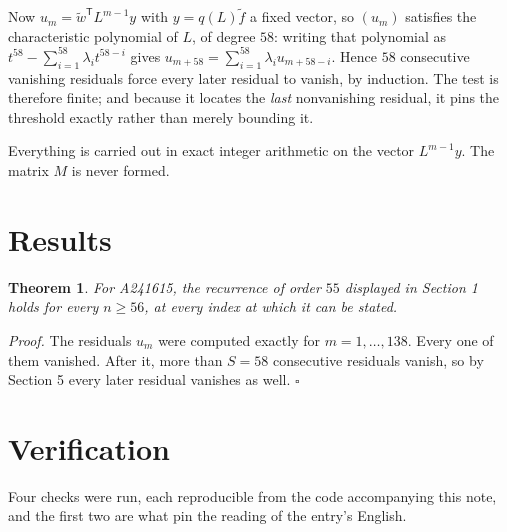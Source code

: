 \documentclass[11pt]{article}
\newtheorem{theorem}{Theorem}
\theoremstyle{definition}
\begin{document}
Now $u_m = \tilde w^{\mathsf T} L^{m-1} y$ with $y = q(L)\tilde f$ a fixed vector, so $(u_m)$ satisfies the characteristic polynomial of $L$, of degree $58$: writing that polynomial as $t^{58} - \sum_{i=1}^{58} \lambda_i t^{58-i}$ gives $u_{m+58} = \sum_{i=1}^{58} \lambda_i u_{m+58-i}$. Hence $58$ consecutive vanishing residuals force every later residual to vanish, by induction. The test is therefore finite; and because it locates the {\itshape last} nonvanishing residual, it pins the threshold exactly rather than merely bounding it.

Everything is carried out in exact integer arithmetic on the vector $L^{m-1}y$. The matrix $M$ is never formed.

\section{Results}

\begin{theorem} For A241615, the recurrence of order $55$ displayed in Section 1 holds for every $n \ge 56$, at every index at which it can be stated.\end{theorem}

{\itshape Proof.} The residuals $u_m$ were computed exactly for $m = 1,\dots,138$. Every one of them vanished. After it, more than $S = 58$ consecutive residuals vanish, so by Section 5 every later residual vanishes as well. $\square$

\section{Verification}

Four checks were run, each reproducible from the code accompanying this note, and the first two are what pin the reading of the entry's English.
\end{document}
